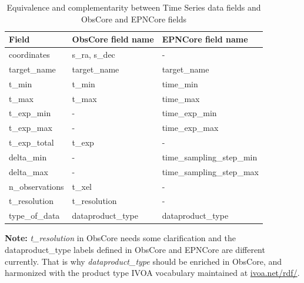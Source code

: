 \documentclass[11pt,a4paper]{ivoa}
\begin{document}
\begin{table}[!htb]  
  \begin{center}
  \begin{small}
  \caption{Equivalence and complementarity between Time Series data fields and ObsCore and EPNCore fields}
   \label{tab:obs_epn}
  \begin{tabular}{|l|l|l|}
\hline
    \textbf{Field}      & \textbf{ObsCore field name} & \textbf{EPNCore field name}  \\%
\hline
    coordinates     & s\_ra, s\_dec          & -                         \\
    \hline
    target\_name    & target\_name           & target\_name              \\
    \hline
    t\_min          & t\_min                 & time\_min                 \\
    \hline
    t\_max          & t\_max                 & time\_max                 \\
    \hline
    t\_exp\_min     &  -                     & time\_exp\_min            \\
    \hline
    t\_exp\_max     &  -                     & time\_exp\_max            \\
    \hline
    t\_exp\_total   &  t\_exp                & -                         \\
    \hline
    delta\_min      &  -                     & time\_sampling\_step\_min \\
    \hline
    delta\_max      &  -                     & time\_sampling\_step\_max \\
    \hline
    n\_observations & t\_xel                 & -                         \\
    \hline
     t\_resolution   & t\_resolution      & -                         \\
    type\_of\_data  & dataproduct\_type & dataproduct\_type         \\
\hline
  \end{tabular}
  \end{small}

  \end{center}
 \end{table} 
 
\textbf{ Note:}  \emph{t\_resolution} in ObsCore needs some clarification and the dataproduct\_type labels defined in ObsCore and EPNCore are different currently. 
That is why \emph{dataproduct\_type} should be enriched in ObsCore, and harmonized with the product type IVOA vocabulary maintained at \url{ivoa.net/rdf/}.
\end{document}
